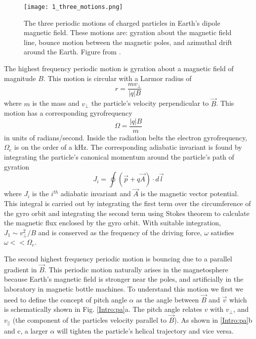 \begin{figure}
\texttt{[image: 1\_three\_motions.png]}
\caption{The three periodic motions of charged particles in Earth's dipole magnetic field. These motions are: gyration about the magnetic field line, bounce motion between the magnetic poles, and azimuthal drift around the Earth. Figure from \citep{Baumjohann1997}.}
\label{Intro:motion_diagram}
\end{figure}


The highest frequency periodic motion is gyration about a magnetic field of magnitude $B$. This motion is circular with a Larmor radius of 
\begin{equation}
r = \frac{m v_\perp}{|q| B}
\end{equation} where $m$ is the mass and $v_\perp$ the particle's velocity perpendicular to $\vec{B}$. This motion has a corresponding gyrofrequency 
\begin{equation}
\Omega = \frac{|q| B}{m}
\end{equation} in units of radians/second. Inside the radiation belts the electron gyrofrequency, $\Omega_e$ is on the order of a kHz. The corresponding adiabatic invariant is found by integrating the particle's canonical momentum around the particle's path of gyration
\begin{equation} \label{J}
J_i = \oint (\vec{p} + q \vec{A}) \cdot d\vec{l}
\end{equation} where $J_i$ is the $i^{th}$ adiabatic invariant and $\vec{A}$ is the magnetic vector potential. This integral is carried out by integrating the first term over the circumference of the gyro orbit and integrating the second term using Stokes theorem to calculate the magnetic flux enclosed by the gyro orbit.  With suitable integration, $J_1 \sim v_\perp^2 / B$ and is conserved as the frequency of the driving force, $\omega$ satisfies $\omega << \Omega_e$.

The second highest frequency periodic motion is bouncing due to a parallel gradient in $\vec{B}$. This periodic motion naturally arises in the magnetosphere because Earth's magnetic field is stronger near the poles, and artificially in the laboratory in magnetic bottle machines. To understand this motion we first we need to define the concept of pitch angle $\alpha$ as the angle between $\vec{B}$ and $\vec{v}$ which is schematically shown in Fig. \ref{Intro:pa}a. The pitch angle relates $v$ with $v_\perp$, and $v_{||}$ (the component of the particles velocity parallel to $\vec{B}$). As shown in \ref{Intro:pa}b and c, a larger $\alpha$ will tighten the particle's helical trajectory and vice versa.

